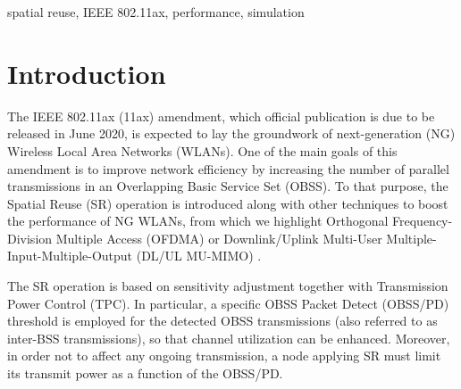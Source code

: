 \documentclass[conference]{IEEEtran}
\begin{document}
	\begin{IEEEkeywords}
		spatial reuse, IEEE 802.11ax, performance, simulation
	\end{IEEEkeywords}
	
	\section{Introduction}
	
	The IEEE 802.11ax (11ax) amendment, which official publication is due to be released in June 2020, is expected to lay the groundwork of next-generation (NG) Wireless Local Area Networks (WLANs). One of the main goals of this amendment is to improve network efficiency by increasing the number of parallel transmissions in an Overlapping Basic Service Set (OBSS). To that purpose, the Spatial Reuse (SR) operation is introduced along with other techniques to boost the performance of NG WLANs, from which we highlight Orthogonal Frequency-Division Multiple Access (OFDMA) or Downlink/Uplink Multi-User  Multiple-Input-Multiple-Output (DL/UL MU-MIMO) \cite{bellalta2016ieee}.
	
	The SR operation is based on sensitivity adjustment together with Transmission Power Control (TPC). In particular, a specific OBSS Packet Detect (OBSS/PD) threshold is employed for the detected OBSS transmissions (also referred to as inter-BSS transmissions), so that channel utilization can be enhanced. Moreover, in order not to affect any ongoing transmission, a node applying SR must limit its transmit power as a function of the OBSS/PD.
	
\end{document}
